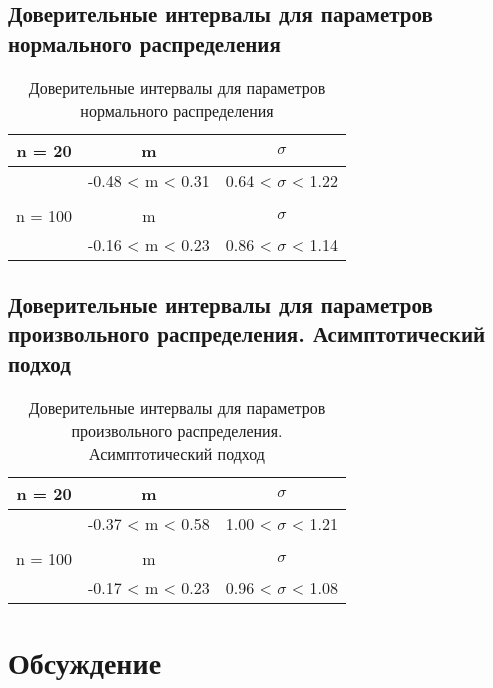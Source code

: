 \documentclass[12pt,a4paper]{scrartcl}
\begin{document}
\subsection{Доверительные интервалы для параметров нормального распределения}
	\begin{table}[H]
	    \centering
	    \begin{tabular}{| c | c | c |}
\hline
 n = 20  & m                & $\sigma$               \\  \hline
         & -0.48 < m < 0.31 & 0.64 < $\sigma$ < 1.22 \\  \hline
         &                  &                        \\  \hline
 n = 100 & m                & $\sigma$               \\  \hline
         & -0.16 < m < 0.23 & 0.86 < $\sigma$ < 1.14 \\
\hline
	    \end{tabular}
	    \caption{Доверительные интервалы для параметров нормального распределения}
	    \label{tab:interv_simple}
	\end{table}
	
	\subsection{Доверительные интервалы для параметров произвольного распределения. Асимптотический подход}
		\begin{table}[H]
	    \centering
	    \begin{tabular}{| c | c | c |}
	    \hline
 n = 20  & m                & $\sigma$               \\  \hline
         & -0.37 < m < 0.58 & 1.00 < $\sigma$ < 1.21 \\  \hline
         &                  &                        \\  \hline
 n = 100 & m                & $\sigma$               \\  \hline
         & -0.17 < m < 0.23 & 0.96 < $\sigma$ < 1.08 \\  \hline
	    \end{tabular}
	    \caption{Доверительные интервалы для параметров произвольного распределения. Асимптотический подход}
	    \label{tab:interv_asimpt}
\end{table}

\section{Обсуждение}
\end{document}
